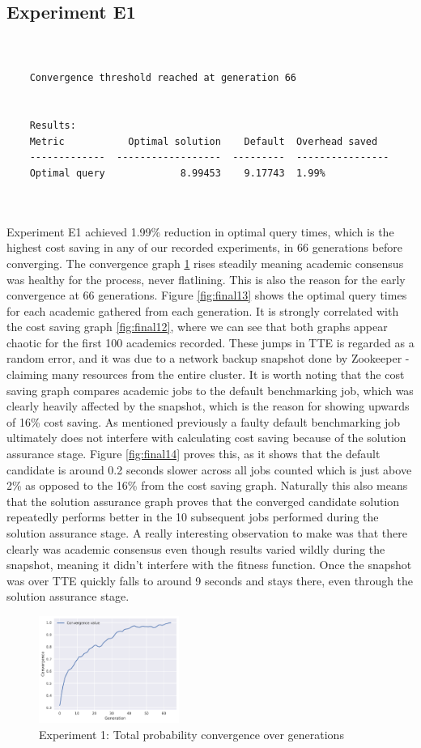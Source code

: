 \documentclass[a4paper,english]{report}
\begin{document}
	\subsection{Experiment E1}
	\begin{verbatim}
	
	
	Convergence threshold reached at generation 66
	
	
	Results:
	Metric           Optimal solution    Default  Overhead saved
	-------------  ------------------  ---------  ----------------
	Optimal query             8.99453    9.17743  1.99%
 
		
	\end{verbatim}
	Experiment E1 achieved 1.99\% reduction in optimal query times, which is the highest cost saving in any of our recorded experiments, in 66 generations before converging. The convergence graph \ref{fig:final11} rises steadily meaning academic consensus was healthy for the process, never flatlining. This is also the reason for the early convergence at 66 generations. Figure \ref{fig:final13} shows the optimal query times for each academic gathered from each generation. It is strongly correlated with the cost saving graph \ref{fig:final12}, where we can see that both graphs appear chaotic for the first 100 academics recorded. These jumps in TTE is regarded as a random error, and it was due to a network backup snapshot done by Zookeeper - claiming many resources from the entire cluster. It is worth noting that the cost saving graph compares academic jobs to the default benchmarking job, which was clearly heavily affected by the snapshot, which is the reason for showing upwards of 16\% cost saving. As mentioned previously a faulty default benchmarking job ultimately does not interfere with calculating cost saving because of the solution assurance stage. Figure \ref{fig:final14} proves this, as it shows that the default candidate is around 0.2 seconds slower across all jobs counted which is just above 2\% as opposed to the 16\% from the cost saving graph. Naturally this also means that the solution assurance graph proves that the converged candidate solution repeatedly performs better in the 10 subsequent jobs performed during the solution assurance stage. A really interesting observation to make was that there clearly was academic consensus even though results varied wildly during the snapshot, meaning it didn't interfere with the fitness function. Once the snapshot was over TTE quickly falls to around 9 seconds and stays there, even through the solution assurance stage.
	\clearpage
	\begin{figure}[H]
		\centering
		\includegraphics[width=130pt]{runlogs/final5/1}
		\caption{Experiment 1: Total probability convergence over generations}
		\label{fig:final11}
	\end{figure}
\end{document}
